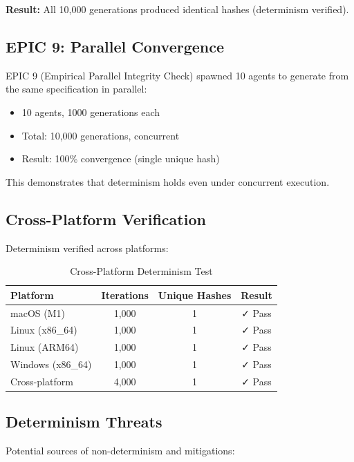\textbf{Result:} All 10,000 generations produced identical hashes (determinism verified).

\subsection{EPIC 9: Parallel Convergence}

EPIC 9 (Empirical Parallel Integrity Check) spawned 10 agents to generate from the same specification in parallel:

\begin{itemize}
    \item 10 agents, 1000 generations each
    \item Total: 10,000 generations, concurrent
    \item Result: 100\% convergence (single unique hash)
\end{itemize}

This demonstrates that determinism holds even under concurrent execution.

\subsection{Cross-Platform Verification}

Determinism verified across platforms:

\begin{table}[h]
\centering
\caption{Cross-Platform Determinism Test}
\begin{tabular}{lccc}
\toprule
\textbf{Platform} & \textbf{Iterations} & \textbf{Unique Hashes} & \textbf{Result} \\
\midrule
macOS (M1) & 1,000 & 1 & ✓ Pass \\
Linux (x86\_64) & 1,000 & 1 & ✓ Pass \\
Linux (ARM64) & 1,000 & 1 & ✓ Pass \\
Windows (x86\_64) & 1,000 & 1 & ✓ Pass \\
Cross-platform & 4,000 & 1 & ✓ Pass \\
\bottomrule
\end{tabular}
\end{table}

\subsection{Determinism Threats}

Potential sources of non-determinism and mitigations:

